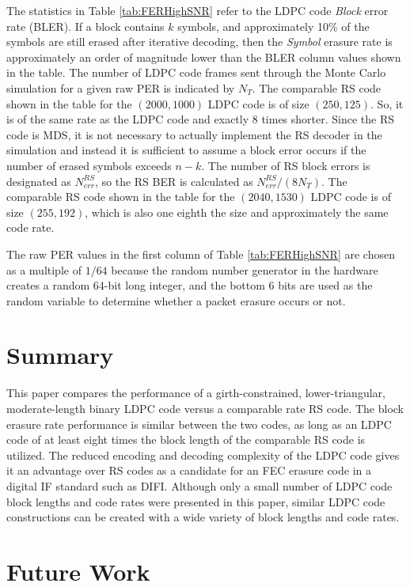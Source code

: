 \documentclass[conference]{IEEEtran}
\begin{document}
The statistics in Table \ref{tab:FERHighSNR} refer to the LDPC code \textit{Block} error rate (BLER).  If a block contains $k$ symbols, and approximately 10\% of the symbols are still erased after iterative decoding, then the \textit{Symbol} erasure rate is approximately an order of magnitude lower than the BLER column values shown in the table.  The number of LDPC code frames sent through the Monte Carlo simulation for a given raw PER is indicated by $N_T$.  The comparable RS code shown in the table for the $(2000, 1000)$ LDPC code is of size $(250, 125)$.  So, it is of the same rate as the LDPC code and exactly 8 times shorter.  Since the RS code is MDS, it is not necessary to actually implement the RS decoder in the simulation and instead it is sufficient to assume a block error occurs if the number of erased symbols exceeds $n-k$.  The number of RS block errors is designated as $N^{RS}_{err}$, so the RS BER is calculated as ${N^{RS}_{err}}/{(8N_T)}$.  The comparable RS code shown in the table for the $(2040, 1530)$ LDPC code is of size $(255, 192)$, which is also one eighth the size and approximately the same code rate. 

The raw PER values in the first column of Table \ref{tab:FERHighSNR} are chosen as a multiple of ${1}/{64}$ because the random number generator in the hardware creates a random 64-bit long integer, and the bottom 6 bits are used as the random variable to determine whether a packet erasure occurs or not.

\section{Summary}\label{sec:Summary}

This paper compares the performance of a girth-constrained, lower-triangular, moderate-length binary LDPC code versus a comparable rate RS code.  The block erasure rate performance is similar between the two codes, as long as an LDPC code of at least eight times the block length of the comparable RS code is utilized.  The reduced encoding and decoding complexity of the LDPC code gives it an advantage over RS codes as a candidate for an FEC erasure code in a digital IF standard such as DIFI.  Although only a small number of LDPC code block lengths and code rates were presented in this paper, similar LDPC code constructions can be created with a wide variety of block lengths and code rates.

\section{Future Work}\label{sec:Future}
\end{document}

